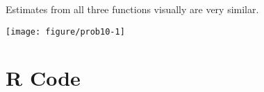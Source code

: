 \documentclass[11pt]{article}\usepackage[]{graphicx}\usepackage[]{color}
\makeatletter
\def\maxwidth{ %
  \ifdim\Gin@nat@width>\linewidth
    \linewidth
  \else
    \Gin@nat@width
  \fi
}
\newenvironment{kframe}{%
 \def\at@end@of@kframe{}%
 \ifinner\ifhmode%
  \def\at@end@of@kframe{\end{minipage}}%
  \begin{minipage}{\columnwidth}%
 \fi\fi%
 \def\FrameCommand##1{\hskip\@totalleftmargin \hskip-\fboxsep
 \colorbox{shadecolor}{##1}\hskip-\fboxsep
     \hskip-\linewidth \hskip-\@totalleftmargin \hskip\columnwidth}%
 \MakeFramed {\advance\hsize-\width
   \@totalleftmargin\z@ \linewidth\hsize
   \@setminipage}}%
 {\par\unskip\endMakeFramed%
 \at@end@of@kframe}
\newenvironment{knitrout}{}{} %
\makeatother
\begin{document}
\begin{enumerate}
Estimates from all three functions visually are very similar.


\begin{knitrout}\footnotesize
{}\color{fgcolor}\begin{kframe}


{\ttfamily\noindent{}}\end{kframe}

{\centering \texttt{[image: figure/prob10-1]} 

}



\end{knitrout}



\end{enumerate}

\appendix
\section*{R Code}
\end{document}
